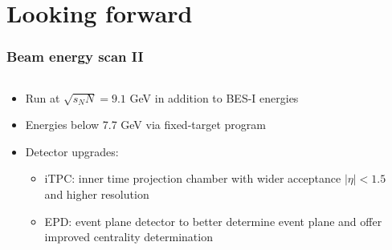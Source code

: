 \documentclass[accentcolor=tud2c,usenames,dvipsnames,colorbacktitle,inverttitle,landscape,german,presentation,t]{tudbeamer}
\begin{document}
  \section{Looking forward}

  \begin{frame}
    \frametitle{Beam energy scan II}
    \begin{columns}[c]
      \begin{column}{0.6\textwidth}
        \begin{itemize}
          \item Run at $\sqrt{s_NN} = 9.1$ GeV in addition to BES-I energies
          \item Energies below 7.7 GeV via fixed-target program
          \item Detector upgrades:
          \begin{itemize}
            \item iTPC: inner time projection chamber with wider acceptance
              $|\eta| < 1.5$ and higher resolution
            \item EPD: event plane detector to better determine event plane and
              offer improved centrality determination
          \end{itemize}
        \end{itemize}
      \end{column}
      \begin{column}{0.4\textwidth}
        \begin{center}

\end{center}
\end{column}
\end{columns}
\end{frame}
\end{document}
